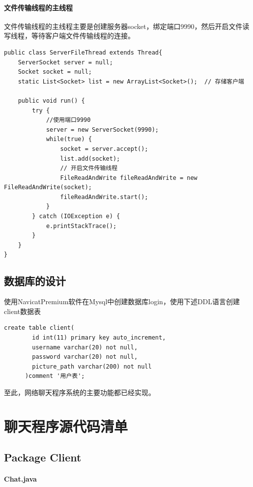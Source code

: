\documentclass[UTF8,12pt]{article}
\begin{document}
\paragraph{文件传输线程的主线程}
文件传输线程的主线程主要是创建服务器socket，绑定端口9990，然后开启文件读写线程，等待客户端文件传输线程的连接。

\begin{lstlisting}[title=文件传输线程的主线程,frame=shadowbox]
    public class ServerFileThread extends Thread{
    ServerSocket server = null;
    Socket socket = null;
    static List<Socket> list = new ArrayList<Socket>();  // 存储客户端

    public void run() {
        try {
            //使用端口9990
            server = new ServerSocket(9990);
            while(true) {
                socket = server.accept();
                list.add(socket);
                // 开启文件传输线程
                FileReadAndWrite fileReadAndWrite = new FileReadAndWrite(socket);
                fileReadAndWrite.start();
            }
        } catch (IOException e) {
            e.printStackTrace();
        }
    }
}
\end{lstlisting}

\subsection{数据库的设计}
使用NavicatPremium软件在Mysql中创建数据库login，使用下述DDL语言创建client数据表

\begin{lstlisting}[title=client数据表的创建,frame=shadowbox]
    create table client(
        id int(11) primary key auto_increment,
        username varchar(20) not null,
        password varchar(20) not null,
        picture_path varchar(200) not null
      )comment '用户表';
\end{lstlisting}

至此，网络聊天程序系统的主要功能都已经实现。

\newpage

\section{聊天程序源代码清单}
\subsection{Package Client}
\paragraph{Chat.java}
\end{document}
